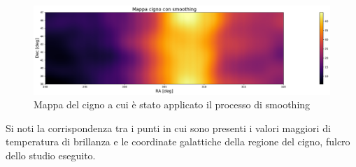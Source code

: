 \begin{figure}[H]
	\centering
	\includegraphics[scale=0.4]{Mappa_finale.pdf}
	\caption{Mappa del cigno a cui è stato applicato il processo di smoothing}
    	\label{fig:Mappa_finale}
\end{figure}

Si noti la corrispondenza tra i punti in cui sono presenti i valori maggiori di temperatura di brillanza e le coordinate galattiche della regione del cigno, fulcro dello studio eseguito.


